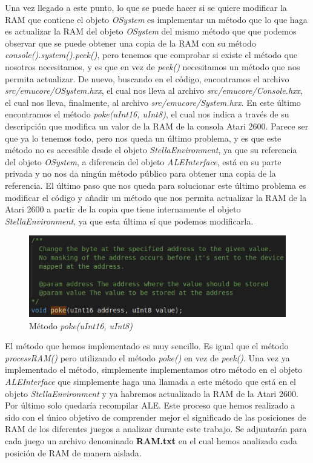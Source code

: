 Una vez llegado a este punto, lo que se puede hacer si se quiere modificar la RAM que contiene el objeto \textit{OSystem} es implementar un método que lo que haga es actualizar la RAM del objeto \textit{OSystem} del mismo método que que podemos observar que se puede obtener una copia de la RAM con su método \textit{console().system().peek()}, pero tenemos que comprobar si existe el método que nosotros necesitamos, y es que en vez de \textit{peek()} necesitamos un método que nos permita actualizar. De nuevo, buscando en el código, encontramos el archivo \textit{src/emucore/OSystem.hxx}, el cual nos lleva al archivo \textit{src/emucore/Console.hxx}, el cual nos lleva, finalmente, al archivo \textit{src/emucore/System.hxx}. En este último encontramos el método \textit{poke(uInt16, uInt8)}, el cual nos indica a través de su descripción que modifica un valor de la RAM de la consola Atari 2600. Parece ser que ya lo tenemos todo, pero nos queda un último problema, y es que este método no es accesible desde el objeto \textit{StellaEnvironment}, ya que su referencia del objeto \textit{OSystem}, a diferencia del objeto \textit{ALEInterface}, está en su parte privada y no nos da ningún método público para obtener una copia de la referencia. El último paso que nos queda para solucionar este último problema es modificar el código y añadir un método que nos permita actualizar la RAM de la Atari 2600 a partir de la copia que tiene internamente el objeto \textit{StellaEnvironment}, ya que esta última sí que podemos modificarla.

\begin{figure}[h]
	\centering
	\includegraphics[width=1\textwidth]{Figures/pokeMethod}
	\caption{Método \textit{poke(uInt16, uInt8)}}
	\label{fig:pokeMethod}
\end{figure}

El método que hemos implementado es muy sencillo. Es igual que el método \textit{processRAM()} pero utilizando el método \textit{poke()} en vez de \textit{peek()}. Una vez ya implementado el método, simplemente implementamos otro método en el objeto \textit{ALEInterface} que simplemente haga una llamada a este método que está en el objeto \textit{StellaEnvironment} y ya habremos actualizado la RAM de la Atari 2600. Por último solo quedaría recompilar ALE. Este proceso que hemos realizado a sido con el único objetivo de comprender mejor el significado de las posiciones de RAM de los diferentes juegos a analizar durante este trabajo. Se adjuntarán para cada juego un archivo denominado \textbf{RAM.txt} en el cual hemos analizado cada posición de RAM de manera aislada.

